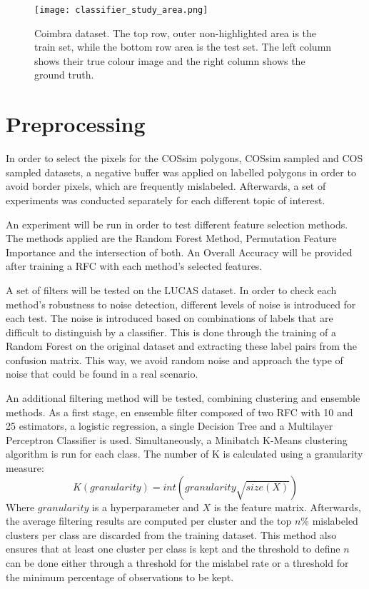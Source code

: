 \documentclass[12pt, english, openany]{book}
\begin{document}
\begin{figure}[H]
  \centering
  \texttt{[image: classifier\_study\_area.png]}
  \caption[Coimbra dataset.]{
    Coimbra dataset. The top row, outer non-highlighted area is the train set,
    while the bottom row area is the test set. The left column shows their true
    colour image and the right column shows the ground truth.}
  \label{fig:classifier-study-area}
\end{figure}

\section{Preprocessing}

In order to select the pixels for the COSsim polygons, COSsim sampled and COS
sampled datasets, a negative buffer was applied on labelled polygons in order
to avoid border pixels, which are frequently mislabeled. Afterwards, a set of
experiments was conducted separately for each different topic of interest.

An experiment will be run in order to test different feature selection methods.
The methods applied are the Random Forest Method, Permutation Feature
Importance and the intersection of both. An Overall Accuracy will be provided
after training a RFC with each method's selected features.

A set of filters will be tested on the LUCAS dataset. In order to check each
method's robustness to noise detection, different levels of noise is introduced
for each test. The noise is introduced based on combinations of labels that are
difficult to distinguish by a classifier. This is done through the training of
a Random Forest on the original dataset and extracting these label pairs from
the confusion matrix. This way, we avoid random noise and approach the type of
noise that could be found in a real scenario.

An additional filtering method will be tested, combining clustering and
ensemble methods. As a first stage, en ensemble filter composed of two RFC with
10 and 25 estimators, a logistic regression, a single Decision Tree and a
Multilayer Perceptron Classifier is used. Simultaneously, a Minibatch K-Means
clustering algorithm is run for each class. The number of K is calculated using
a granularity measure:
\begin{equation} \label{eq:k-granularity-formula}
  K(granularity) = int(granularity\sqrt{size(X)})
\end{equation}
Where $granularity$ is a hyperparameter and $X$ is
the feature matrix. Afterwards, the average filtering results are computed per
cluster and the top $n$\% mislabeled clusters per class are
discarded from the training dataset. This method also ensures that at least one
cluster per class is kept and the threshold to define $n$
can be done either through a threshold for the mislabel rate or a threshold for
the minimum percentage of observations to be kept.
\end{document}
